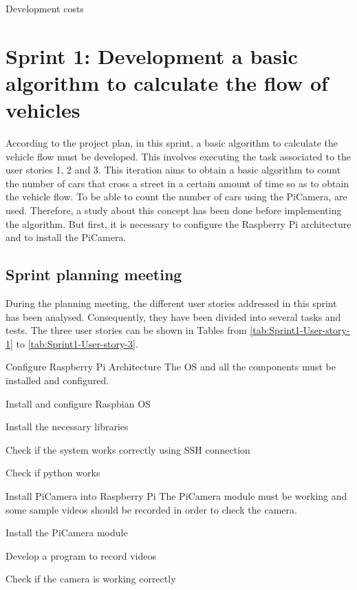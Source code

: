 \begin{table}[hp]
	\centering
	{\small
		
	}
	\caption{Development costs}
	\label{tab:Development-Costs}
\end{table}




\section{Sprint 1: Development a basic algorithm to calculate the flow of vehicles}
According to the project plan, in this sprint, a basic algorithm to calculate the vehicle flow must be developed. This involves executing the task associated to the user stories 1, 2 and 3. This iteration aims to obtain a basic algorithm to count the number of cars that cross a street in a certain amount of time so as to obtain the vehicle flow.  To be able to count the number of cars using the PiCamera,  are used. Therefore, a study about this concept has been done before implementing the algorithm. But first, it is necessary to configure the Raspberry Pi architecture and to install the PiCamera. 

\subsection{Sprint planning meeting}
During the planning meeting, the different user stories addressed in this sprint has been analysed. Consequently, they have been divided into several tasks and tests. The three user stories can be shown in Tables from \ref{tab:Sprint1-User-story-1} to \ref{tab:Sprint1-User-story-3}.

{Configure Raspberry Pi Architecture}
{The \ac{OS} and all the components must be installed and configured.}
{	\item Install and configure Raspbian \ac{OS}
	\item Install the necessary libraries
}{	\item Check if the system works correctly using SSH connection
	\item Check if python works
}

{Install PiCamera into Raspberry Pi}
{The PiCamera module must be working and some sample videos should be recorded in order to check the camera.}
{	\item Install the PiCamera module
	\item Develop a program to record videos
}{	\item Check if the camera is working correctly
}

